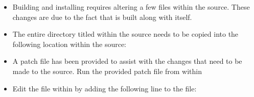 
\begin{itemize}
\item Building and installing \irprogram requires altering a few files within the \elmer source. These changes are due to the fact that \irprogram is built along with \elmer itself. 
\item The entire directory titled  within the \irprogram source needs to be copied into the following location within the \elmer source:

\tab {}

\item A patch file has been provided to assist with the changes that need to be made to the \elmer source. Run the provided patch file from within 

\tab {}

\item Edit the  file within  by adding the following line to the file:

\tab {}



\end{itemize}


